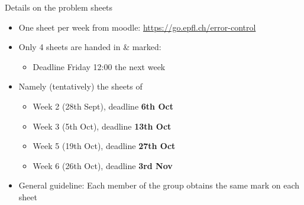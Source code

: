 \begin{frame}{Details on the problem sheets}
    \begin{itemize}
        \item One sheet per week from moodle: \url{https://go.epfl.ch/error-control}
        \vspace{1em}
        \item Only 4 sheets are handed in \& marked:
            \begin{itemize}
                \vspace{-0.3em}
                \item Deadline Friday 12:00 the next week
            \end{itemize}
        \vspace{1em}
        \item Namely \textcolor{grey5}{(tentatively)} the sheets of
            \begin{itemize}
                \vspace{-0.3em}
                \item Week 2 \textcolor{grey5}{(28th Sept)}, deadline \textbf{6th Oct}
                \vspace{-0.3em}
                \item Week 3 \textcolor{grey5}{(5th Oct)}, deadline \textbf{13th Oct}
                \vspace{-0.3em}
                \item Week 5 \textcolor{grey5}{(19th Oct)}, deadline \textbf{27th Oct}
                \vspace{-0.3em}
                \item Week 6 \textcolor{grey5}{(26th Oct)}, deadline \textbf{3rd Nov}
            \end{itemize}
        \vspace{1em}
        \item General guideline: Each member of the group obtains the same mark on each sheet
    \end{itemize}
\end{frame}

